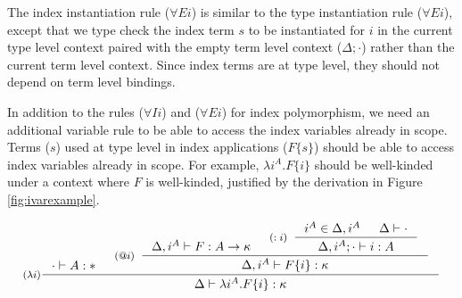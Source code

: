 The index instantiation rule ($\forall E i$) is similar to
the type instantiation rule ($\forall E i$), except that
we type check the index term $s$ to be instantiated for $i$
in the current type level context paired with the empty term level context
($\Delta;\cdot$) rather than the current term level context.
Since index terms are at type level, they should not depend on
term level bindings.

In addition to the rules ($\forall I i$) and ($\forall E i$) for
index polymorphism, we need an additional variable rule 
to be able to access the index variables already in scope. Terms ($s$) used
at type level in index applications ($F\{s\}$) should be able to access
index variables already in scope. For example, $\lambda i^A.F\{i\}$ should be
well-kinded under a context where $F$ is well-kinded,
justified by the derivation in Figure \ref{fig:ivarexample}.
\begin{figure*}
\[ \inference[($\lambda i$)]
      { \cdot |- A:* &
	\inference[($@i$)]{ \Delta, i^A |- F : A -> \kappa
                          & \inference[($:i$)]{ i^A\in \Delta,i^A
                                              & \Delta |- \cdot }
                                              {\Delta,i^A;\cdot |- i:A}
                          }
                          {\Delta, i^A |- F\{i\} : \kappa} }
      {\Delta |- \lambda i^A.F\{i\} :\kappa}
\]
\caption{Kinding derivation for an index abstraction}
\label{fig:ivarexample}
\end{figure*}







